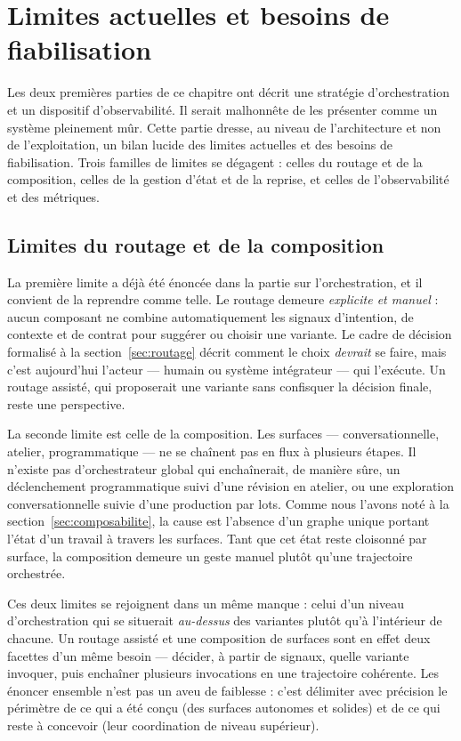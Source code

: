 \section{Limites actuelles et besoins de fiabilisation}
\label{sec:limites}

Les deux premières parties de ce chapitre ont décrit une stratégie
d'orchestration et un dispositif d'observabilité. Il serait malhonnête
de les présenter comme un système pleinement mûr. Cette partie dresse,
au niveau de l'architecture et non de l'exploitation, un bilan lucide
des limites actuelles et des besoins de fiabilisation. Trois familles
de limites se dégagent : celles du routage et de la composition,
celles de la gestion d'état et de la reprise, et celles de
l'observabilité et des métriques.

\subsection{Limites du routage et de la composition}
\label{sec:limites-routage}

La première limite a déjà été énoncée dans la partie sur
l'orchestration, et il convient de la reprendre comme telle. Le
routage demeure \emph{explicite et manuel} : aucun composant ne
combine automatiquement les signaux d'intention, de contexte et de
contrat pour suggérer ou choisir une variante. Le cadre de décision
formalisé à la section~\ref{sec:routage} décrit comment le choix
\emph{devrait} se faire, mais c'est aujourd'hui l'acteur — humain ou
système intégrateur — qui l'exécute. Un routage assisté, qui
proposerait une variante sans confisquer la décision finale, reste une
perspective.

La seconde limite est celle de la composition. Les surfaces —
conversationnelle, atelier, programmatique — ne se chaînent pas en
flux à plusieurs étapes. Il n'existe pas d'orchestrateur global qui
enchaînerait, de manière sûre, un déclenchement programmatique suivi
d'une révision en atelier, ou une exploration conversationnelle suivie
d'une production par lots. Comme nous l'avons noté à la
section~\ref{sec:composabilite}, la cause est l'absence d'un graphe
unique portant l'état d'un travail à travers les surfaces. Tant que
cet état reste cloisonné par surface, la composition demeure un geste
manuel plutôt qu'une trajectoire orchestrée.

Ces deux limites se rejoignent dans un même manque : celui d'un niveau
d'orchestration qui se situerait \emph{au-dessus} des variantes plutôt
qu'à l'intérieur de chacune. Un routage assisté et une composition de
surfaces sont en effet deux facettes d'un même besoin — décider, à
partir de signaux, quelle variante invoquer, puis enchaîner plusieurs
invocations en une trajectoire cohérente. Les énoncer ensemble n'est
pas un aveu de faiblesse : c'est délimiter avec précision le périmètre
de ce qui a été conçu (des surfaces autonomes et solides) et de ce qui
reste à concevoir (leur coordination de niveau supérieur).

